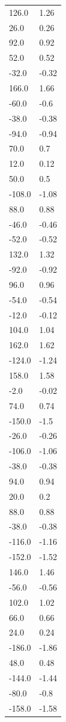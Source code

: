 \begin{longtable}{ll}
126.0 & 1.26 \\
26.0 & 0.26 \\
92.0 & 0.92 \\
52.0 & 0.52 \\
-32.0 & -0.32 \\
166.0 & 1.66 \\
-60.0 & -0.6 \\
-38.0 & -0.38 \\
-94.0 & -0.94 \\
70.0 & 0.7 \\
12.0 & 0.12 \\
50.0 & 0.5 \\
-108.0 & -1.08 \\
88.0 & 0.88 \\
-46.0 & -0.46 \\
-52.0 & -0.52 \\
132.0 & 1.32 \\
-92.0 & -0.92 \\
96.0 & 0.96 \\
-54.0 & -0.54 \\
-12.0 & -0.12 \\
104.0 & 1.04 \\
162.0 & 1.62 \\
-124.0 & -1.24 \\
158.0 & 1.58 \\
-2.0 & -0.02 \\
74.0 & 0.74 \\
-150.0 & -1.5 \\
-26.0 & -0.26 \\
-106.0 & -1.06 \\
-38.0 & -0.38 \\
94.0 & 0.94 \\
20.0 & 0.2 \\
88.0 & 0.88 \\
-38.0 & -0.38 \\
-116.0 & -1.16 \\
-152.0 & -1.52 \\
146.0 & 1.46 \\
-56.0 & -0.56 \\
102.0 & 1.02 \\
66.0 & 0.66 \\
24.0 & 0.24 \\
-186.0 & -1.86 \\
48.0 & 0.48 \\
-144.0 & -1.44 \\
-80.0 & -0.8 \\
-158.0 & -1.58 \\

\end{longtable}

